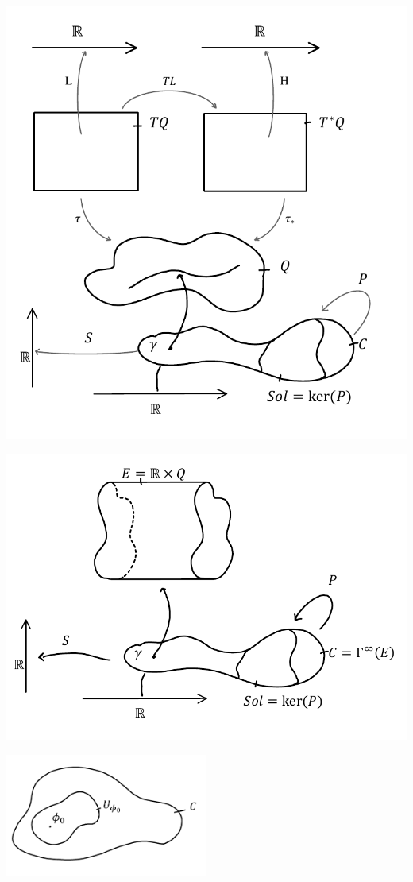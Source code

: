 \documentclass{article}
\begin{document}
	\includegraphics[width=\textwidth]{../Pictures/GeoMecFrame} 

	\includegraphics[width=\textwidth]{../Pictures/FieMecFrame} 

	\includegraphics[width=0.5\textwidth]{../Pictures/Linearization} 
\end{document}
